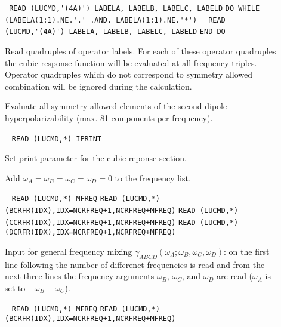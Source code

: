 \begin{description}
\item[] \verb| |\newline
\verb|READ (LUCMD,'(4A)') LABELA, LABELB, LABELC, LABELD|\newline
\verb|DO WHILE (LABELA(1:1).NE.'.' .AND. LABELA(1:1).NE.'*')|\newline
\verb|  READ (LUCMD,'(4A)') LABELA, LABELB, LABELC, LABELD|\newline
\verb|END DO|

Read quadruples of operator labels.
For each of these operator quadruples the cubic response
function will be evaluated at all frequency triples.
Operator quadruples which do not correspond to symmetry allowed
combination will be ignored during the calculation. 

\item[] 
Evaluate all symmetry allowed elements of the second dipole
hyperpolarizability (max. 81 components per frequency).

\item[] \verb| |\newline
\verb|READ (LUCMD,*) IPRINT|

Set print parameter for the cubic reponse section.

\item[] 
Add $\omega_A = \omega_B = \omega_C = \omega_D = 0$ to the frequency list.

\item[] \verb| |\newline
\verb|READ (LUCMD,*) MFREQ|\newline
\verb|READ (LUCMD,*) (BCRFR(IDX),IDX=NCRFREQ+1,NCRFREQ+MFREQ)|\newline
\verb|READ (LUCMD,*) (CCRFR(IDX),IDX=NCRFREQ+1,NCRFREQ+MFREQ)|\newline
\verb|READ (LUCMD,*) (DCRFR(IDX),IDX=NCRFREQ+1,NCRFREQ+MFREQ)|

Input for general frequency mixing
$\gamma_{ABCD}(\omega_A;\omega_B,\omega_C,\omega_D)$: on the first line
following  the number of differenct frequencies
is read and from the next three lines the frequency arguments 
$\omega_B$, $\omega_C$, and $\omega_D$ are read
($\omega_A$ is set to $-\omega_B-\omega_C$).
                                                           
\item[] \verb| |\newline
\verb|READ (LUCMD,*) MFREQ|\newline
\verb|READ (LUCMD,*) (BCRFR(IDX),IDX=NCRFREQ+1,NCRFREQ+MFREQ)|


\end{description}
